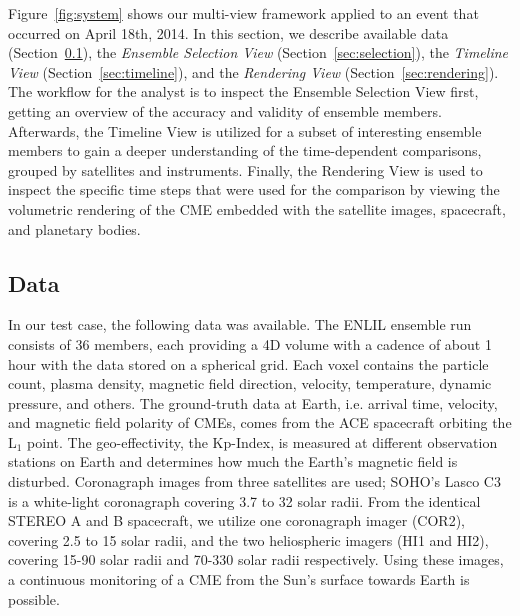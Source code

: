 \documentclass{vgtc}                          %
\begin{document}
Figure~\ref{fig:system} shows our multi-view framework applied to an event that occurred on April 18th, 2014. In this section, we describe available data (Section~\ref{sec:data}), the \emph{Ensemble Selection View} (Section~\ref{sec:selection}), the \emph{Timeline View} (Section~\ref{sec:timeline}), and the \emph{Rendering View} (Section~\ref{sec:rendering}). The workflow for the analyst is to inspect the Ensemble Selection View first, getting an overview of the accuracy and validity of ensemble members. Afterwards, the Timeline View is utilized for a subset of interesting ensemble members to gain a deeper understanding of the time-dependent comparisons, grouped by satellites and instruments. Finally, the Rendering View is used to inspect the specific time steps that were used for the comparison by viewing the volumetric rendering of the CME embedded with the satellite images, spacecraft, and planetary bodies.

\subsection{Data} \label{sec:data}
In our test case, the following data was available. The ENLIL ensemble run consists of 36 members, each providing a 4D volume with a cadence of about 1 hour with the data stored on a spherical grid. Each voxel contains the particle count, plasma density, magnetic field direction, velocity, temperature, dynamic pressure, and others. The ground-truth data at Earth, i.e. arrival time, velocity, and magnetic field polarity of CMEs, comes from the ACE spacecraft orbiting the L$_1$ point. The geo-effectivity, the Kp-Index, is measured at different observation stations on Earth and determines how much the Earth's magnetic field is disturbed. Coronagraph images from three satellites are used; SOHO's Lasco C3 is a white-light coronagraph covering 3.7 to 32 solar radii. From the identical STEREO A and B spacecraft, we utilize one coronagraph imager (COR2), covering 2.5 to 15 solar radii, and the two heliospheric imagers (HI1 and HI2), covering 15-90 solar radii and 70-330 solar radii respectively. Using these images, a continuous monitoring of a CME from the Sun's surface towards Earth is possible.
\end{document}
